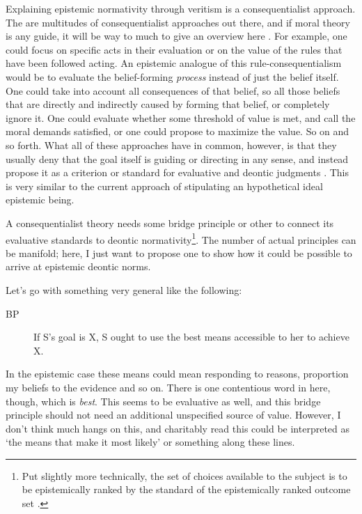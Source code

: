 \documentclass[12pt,numbers=noenddot]{scrartcl}
\begin{document}
Explaining epistemic normativity through veritism is a consequentialist approach. The are multitudes of consequentialist approaches out there, and if moral theory is any guide, it will be way to much to give an overview here \autocite{sep-consequentialism}. For example, one could focus on specific acts in their evaluation or on the value of the rules that have been followed acting. An epistemic analogue of this rule-consequentialism would be to evaluate the belief-forming \emph{process} instead of just the belief itself. One could take into account all consequences of that belief, so all those beliefs that are directly and indirectly caused by forming that belief, or completely ignore it. One could evaluate whether some threshold of value is met, and call the moral demands satisfied, or one could propose to maximize the value. So on and so forth. What all of these approaches have in common, however, is that they usually deny that the goal itself is guiding or directing in any sense, and instead propose it as a criterion or standard for evaluative and deontic judgments \autocite[16]{sep-consequentialism}. This is very similar to the current approach of stipulating an hypothetical ideal epistemic being.

A consequentialist theory needs some bridge principle or other to connect its evaluative standards to deontic normativity\footnote{Put slightly more technically, the set of choices available to the subject is to be epistemically ranked by the standard of the epistemically ranked outcome set \autocite{adler_ranking_2011}.}. The number of actual principles can be manifold; here, I just want to propose one to show how it could be possible to arrive at epistemic deontic norms. 

Let's go with something very general like the following:

\begin{description}
    \item[BP] If S's goal is X, S ought to use the best means accessible to her to achieve X.
\end{description}

In the epistemic case these means could mean responding to reasons, proportion my beliefs to the evidence and so on. There is one contentious word in here, though, which is \emph{best}. This seems to be evaluative as well, and this bridge principle should not need an additional unspecified source of value. However, I don't think much hangs on this, and charitably read this could be interpreted as ‘the means that make it most likely’ or something along these lines.
\end{document}
